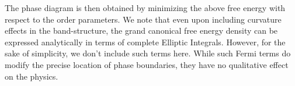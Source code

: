\documentclass[prb,aps,amssymb,showpacs,twocolumn,amsmath,floatfix]{revtex4}
\begin{document}
The phase diagram is then obtained by minimizing the above free energy with respect to the 
order parameters.  We note that even upon including curvature effects in the band-structure, the grand canonical free energy density can be expressed analytically in terms of complete Elliptic Integrals.  However, for the sake 
of simplicity, we don't include such terms here.  While such Fermi terms do modify the precise 
location of phase boundaries, they have no qualitative effect on the physics.   



\end{document}
